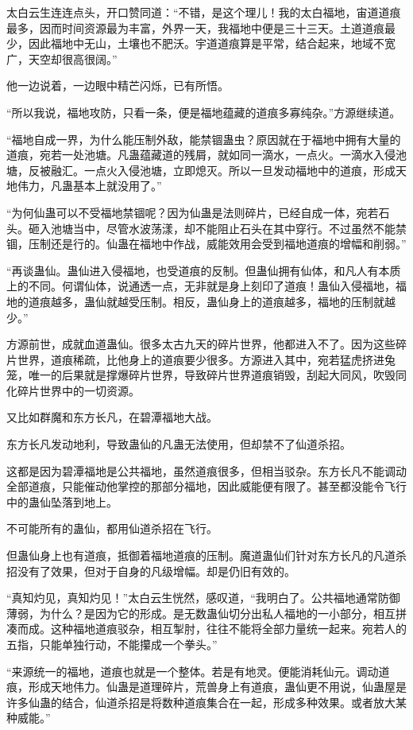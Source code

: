 \begin{this_body}
太白云生连连点头，开口赞同道：“不错，是这个理儿！我的太白福地，宙道道痕最多，因而时间资源最为丰富，外界一天，我福地中便是三十三天。土道道痕最少，因此福地中无山，土壤也不肥沃。宇道道痕算是平常，结合起来，地域不宽广，天空却很高很阔。”

他一边说着，一边眼中精芒闪烁，已有所悟。

“所以我说，福地攻防，只看一条，便是福地蕴藏的道痕多寡纯杂。”方源继续道。

“福地自成一界，为什么能压制外敌，能禁锢蛊虫？原因就在于福地中拥有大量的道痕，宛若一处池塘。凡蛊蕴藏道的残屑，就如同一滴水，一点火。一滴水入侵池塘，反被融汇。一点火入侵池塘，立即熄灭。所以一旦发动福地中的道痕，形成天地伟力，凡蛊基本上就没用了。”

“为何仙蛊可以不受福地禁锢呢？因为仙蛊是法则碎片，已经自成一体，宛若石头。砸入池塘当中，尽管水波荡漾，却不能阻止石头在其中穿行。不过虽然不能禁锢，压制还是行的。仙蛊在福地中作战，威能效用会受到福地道痕的增幅和削弱。”

“再谈蛊仙。蛊仙进入侵福地，也受道痕的反制。但蛊仙拥有仙体，和凡人有本质上的不同。何谓仙体，说通透一点，无非就是身上刻印了道痕！蛊仙入侵福地，福地的道痕越多，蛊仙就越受压制。相反，蛊仙身上的道痕越多，福地的压制就越少。”

方源前世，成就血道蛊仙。很多太古九天的碎片世界，他都进入不了。因为这些碎片世界，道痕稀疏，比他身上的道痕要少很多。方源进入其中，宛若猛虎挤进兔笼，唯一的后果就是撑爆碎片世界，导致碎片世界道痕销毁，刮起大同风，吹毁同化碎片世界中的一切资源。

又比如群魔和东方长凡，在碧潭福地大战。

东方长凡发动地利，导致蛊仙的凡蛊无法使用，但却禁不了仙道杀招。

这都是因为碧潭福地是公共福地，虽然道痕很多，但相当驳杂。东方长凡不能调动全部道痕，只能催动他掌控的那部分福地，因此威能便有限了。甚至都没能令飞行中的蛊仙坠落到地上。

不可能所有的蛊仙，都用仙道杀招在飞行。

但蛊仙身上也有道痕，抵御着福地道痕的压制。魔道蛊仙们针对东方长凡的凡道杀招没有了效果，但对于自身的凡级增幅。却是仍旧有效的。

“真知灼见，真知灼见！”太白云生恍然，感叹道，“我明白了。公共福地通常防御薄弱，为什么？是因为它的形成。是无数蛊仙切分出私人福地的一小部分，相互拼凑而成。这种福地道痕驳杂，相互掣肘，往往不能将全部力量统一起来。宛若人的五指，只能单独行动，不能攥成一个拳头。”

“来源统一的福地，道痕也就是一个整体。若是有地灵。便能消耗仙元。调动道痕，形成天地伟力。仙蛊是道理碎片，荒兽身上有道痕，蛊仙更不用说，仙蛊屋是许多仙蛊的结合，仙道杀招是将数种道痕集合在一起，形成多种效果。或者放大某种威能。”


\end{this_body}
